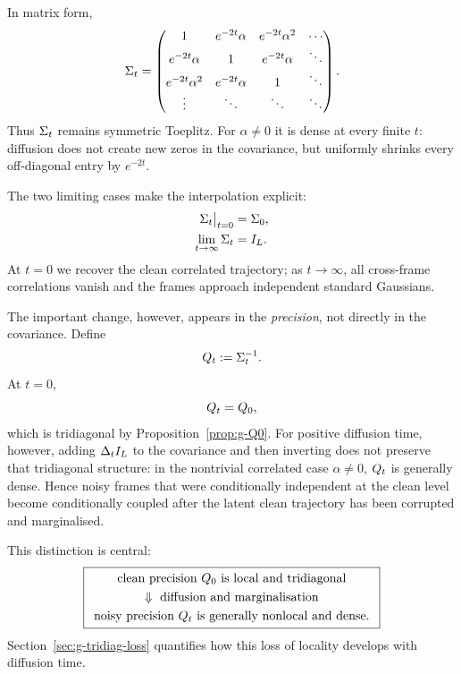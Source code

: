 In matrix form,
\begin{equation}
  \Sigma_t
  =
  \begin{pmatrix}
    1
    & e^{-2t}\alpha
    & e^{-2t}\alpha^2
    & \cdots \\
    e^{-2t}\alpha
    & 1
    & e^{-2t}\alpha
    & \ddots \\
    e^{-2t}\alpha^2
    & e^{-2t}\alpha
    & 1
    & \ddots \\
    \vdots
    & \ddots
    & \ddots
    & \ddots
  \end{pmatrix}.
  \label{eq:g-Sigt-matrix}
\end{equation}
Thus $\Sigma_t$ remains symmetric Toeplitz. For $\alpha\neq0$ it is dense at
every finite $t$: diffusion does not create new zeros in the covariance,
but uniformly shrinks every off-diagonal entry by $e^{-2t}$.

The two limiting cases make the interpolation explicit:
\begin{align}
  \Sigma_t\big|_{t=0}
  &=
  \Sigma_0,\\
  \lim_{t\to\infty}\Sigma_t
  &=
  I_L.
  \label{eq:g-Sigt-limits}
\end{align}
At $t=0$ we recover the clean correlated trajectory; as $t\to\infty$, all
cross-frame correlations vanish and the frames approach independent standard
Gaussians.

The important change, however, appears in the \emph{precision}, not directly
in the covariance. Define
\begin{equation}
  Q_t:=\Sigma_t^{-1}.
  \label{eq:g-Qt-def}
\end{equation}
At $t=0$,
\[
  Q_t=Q_0,
\]
which is tridiagonal by Proposition~\ref{prop:g-Q0}. For positive diffusion
time, however, adding $\Delta_t I_L$ to the covariance and then inverting does
not preserve that tridiagonal structure: in the nontrivial correlated case
$\alpha\neq0$, $Q_t$ is generally dense. Hence noisy frames that were
conditionally independent at the clean level become conditionally coupled
after the latent clean trajectory has been corrupted and marginalised.

This distinction is central:
\begin{equation}
  \boxed{
  \begin{array}{c}
    \text{clean precision }Q_0
    \text{ is local and tridiagonal}
    \\[3pt]
    \Downarrow\ \text{diffusion and marginalisation}
    \\[3pt]
    \text{noisy precision }Q_t
    \text{ is generally nonlocal and dense}.
  \end{array}}
  \label{eq:g-locality-loss-summary}
\end{equation}
Section~\ref{sec:g-tridiag-loss} quantifies how this loss of locality develops
with diffusion time.


